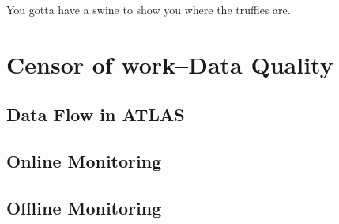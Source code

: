 \begin{savequote}[75mm]
You gotta have a swine to show you where the truffles are.
\end{savequote}

\chapter{Censor of work--Data Quality}

\section{Data Flow in ATLAS}

\section{Online Monitoring}

\section{Offline Monitoring}

